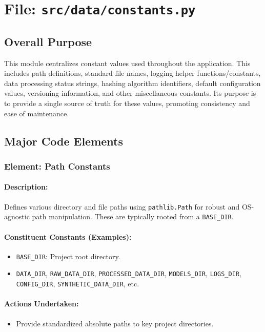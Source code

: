 \documentclass{article}
\begin{document}
\newpage
\section{File: \texttt{src/data/constants.py}}
\subsection{Overall Purpose}
This module centralizes constant values used throughout the application. This includes path definitions, standard file names, logging helper functions/constants, data processing status strings, hashing algorithm identifiers, default configuration values, versioning information, and other miscellaneous constants. Its purpose is to provide a single source of truth for these values, promoting consistency and ease of maintenance.

\subsection{Major Code Elements}

\subsubsection{Element: Path Constants}
\paragraph{Description:} Defines various directory and file paths using \texttt{pathlib.Path} for robust and OS-agnostic path manipulation. These are typically rooted from a \texttt{BASE\_DIR}.
\paragraph{Constituent Constants (Examples):}
\begin{itemize}
    \item \texttt{BASE\_DIR}: Project root directory.
    \item \texttt{DATA\_DIR}, \texttt{RAW\_DATA\_DIR}, \texttt{PROCESSED\_DATA\_DIR}, \texttt{MODELS\_DIR}, \texttt{LOGS\_DIR}, \texttt{CONFIG\_DIR}, \texttt{SYNTHETIC\_DATA\_DIR}, etc.
\end{itemize}
\paragraph{Actions Undertaken:}
\begin{itemize}
    \item Provide standardized absolute paths to key project directories.
\end{itemize}
\end{document}
